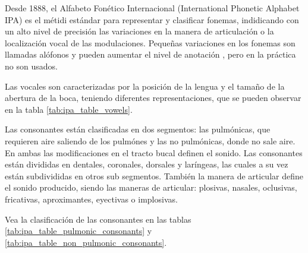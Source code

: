 Desde 1888, el Alfabeto Fonético Internacional (International Phonetic Alphabet IPA) es el métidi estándar para representar y clasificar fonemas, indidicando con un alto nivel de precisión las variaciones en la manera de articulación o la localización vocal de las modulaciones. Pequeñas variaciones en los fonemas son llamadas alófonos y pueden aumentar el nivel de anotación  \cite{IPAAlphabet}, pero en la práctica no son usados.

Las vocales son caracterizadas por la posición de la lengua y el tamaño de la abertura de la boca, teniendo diferentes representaciones, que se pueden observar en la tabla \ref{tab:ipa_table_vowels}. 

Las consonantes están clasificadas en dos segmentos: las pulmónicas, que requieren aire saliendo de los pulmónes y las no pulmónicas, donde no sale aire. En ambas las modificaciones en el tracto bucal definen el sonido. Las consonantes están divididas en dentales, coronales, dorsales y laríngeas, las cuales a su vez están subdivididas en otros sub segmentos. También la manera de articular define el sonido producido, siendo las maneras de articular: plosivas, nasales, oclusivas, fricativas, aproximantes, eyectivas o implosivas.

Vea la clasificación de las consonantes en las tablas \ref{tab:ipa_table_pulmonic_consonants} y \ref{tab:ipa_table_non_pulmonic_consonants}.

